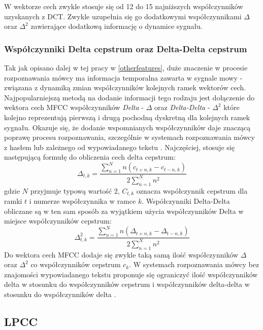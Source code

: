W wektorze cech zwykle stosuje się od 12 do 15 najniższych współczynników uzyskanych z DCT. Zwykle uzupełnia się go dodatkowymi współczynnikami $\Delta$ oraz $\Delta^2$ zawierające dodatkową informację o dynamice sygnału. 

\subsubsection{Współczynniki Delta cepstrum oraz Delta-Delta cepstrum}

  Tak jak opisano dalej w tej pracy w \ref{otherfeatures}, duże znaczenie w procesie rozpoznawania mówcy ma informacja temporalna zawarta w sygnale mowy - związana z dynamiką zmian współczynników kolejnych ramek wektorów cech. Najpopularniejszą metodą na dodanie informacji tego rodzaju jest dołączenie do wektora cech MFCC współczynników \textit{Delta} - $\Delta$ oraz \textit{Delta-Delta} - $\Delta^2$ które kolejno reprezentują pierwszą i drugą pochodną dyskretną dla kolejnych ramek sygnału. Okazuje się, że dodanie wspomnianych współczynników daje znaczącą poprawę procesu rozpoznawania, szczególnie w systemach rozpoznawania mówcy z hasłem lub zależnego od wypowiadanego tekstu \cite{delta}. Najczęściej, stosuje się następującą formułę do obliczenia cech delta cepstrum:
\begin{equation}
  \Delta_{t, k} = \frac{\sum^N_{n=1} n(c_{t+n,k} - c_{t-n,k})}{2\sum^N_{n=1} n^2} 
\end{equation}
gdzie $N$ przyjmuje typową wartość 2, $C_{t,k}$ oznacza współczynnik cepstrum dla ramki $t$ i numerze współczynnika w ramce $k$. Współczynniki Delta-Delta obliczane są w ten sam sposób za wyjątkiem użycia współczynników Delta w miejsce współczynników cepstrum:
\begin{equation}
  \Delta^2_{t, k} = \frac{\sum^N_{n=1} n(\Delta_{t+n,k} - \Delta_{t-n,k})}{2\sum^N_{n=1} n^2} 
\end{equation}
Do wektora cech MFCC dodaje się zwykle taką samą ilość współczynników $\Delta$ oraz $\Delta^2$ co współczynników cepstrum $c_{k}$. W systemach rozpoznawania mówcy bez znajomości wypowiadanego tekstu proponuje się ograniczyć ilość współczynników delta w stosunku do współczynników cepstrum i współczynników delta-delta w stosunku do współczynników delta \cite{fosr}.

\subsection{LPCC}
\label{LPCC}

